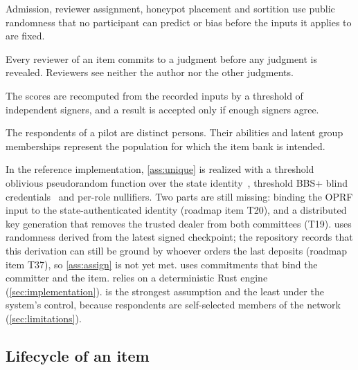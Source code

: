 \begin{assumption}\label{ass:assign}
Admission, reviewer assignment, honeypot placement and sortition use public randomness that no
participant can predict or bias before the inputs it applies to are fixed.
\end{assumption}

\begin{assumption}\label{ass:blind}
Every reviewer of an item commits to a judgment before any judgment is revealed. Reviewers
see neither the author nor the other judgments.
\end{assumption}

\begin{assumption}\label{ass:repro}
The scores are recomputed from the recorded inputs by a threshold of independent signers, and
a result is accepted only if enough signers agree.
\end{assumption}

\begin{assumption}\label{ass:sample}
The respondents of a pilot are distinct persons. Their abilities and latent group memberships
represent the population for which the item bank is intended.
\end{assumption}

In the reference implementation, \cref{ass:unique} is realized with a threshold
oblivious pseudorandom function over the state identity~\cite{rfc9497},
threshold BBS+ blind credentials~\cite{boneh2004short,au2006bbsplus,tessaro2023bbs} and
per-role nullifiers. Two parts are still missing: binding the OPRF input to the
state-authenticated identity (roadmap item T20), and a distributed key generation that removes the
trusted dealer from both committees (T19).  uses randomness derived from the latest signed
checkpoint; the repository records that this derivation can still be ground by whoever orders
the last deposits (roadmap item T37), so \cref{ass:assign} is not yet met. 
uses commitments that bind the committer and the item.  relies on a deterministic
Rust engine (\cref{sec:implementation}).  is the strongest assumption and the
least under the system's control, because respondents are self-selected members of the network
(\cref{sec:limitations}).

\subsection{Lifecycle of an item}

